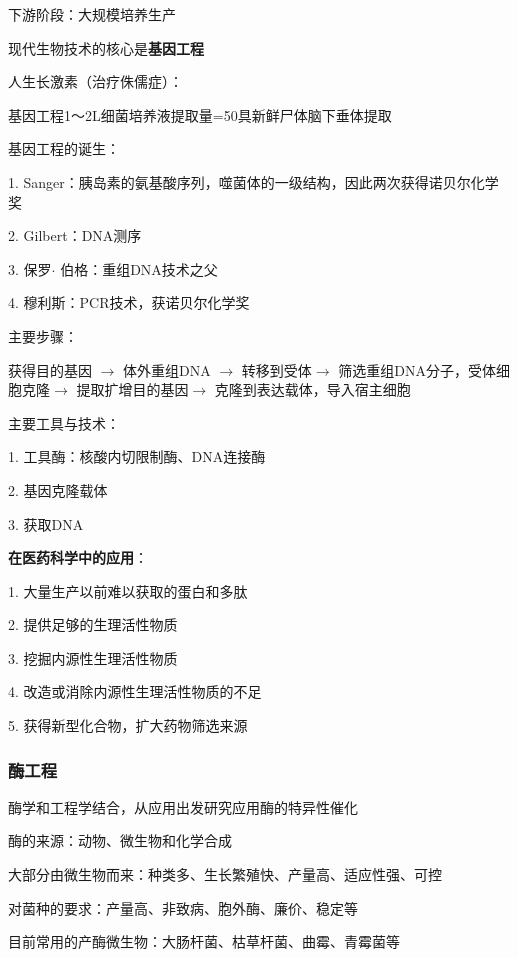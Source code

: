 下游阶段：大规模培养生产
\begin{notation}
    现代生物技术的核心是\textbf{基因工程}
\end{notation}
\begin{eg}
    人生长激素（治疗侏儒症）：

    基因工程1～2L细菌培养液提取量=50具新鲜尸体脑下垂体提取
\end{eg}
基因工程的诞生：

1. Sanger：胰岛素的氨基酸序列，噬菌体的一级结构，因此两次获得诺贝尔化学奖

2. Gilbert：DNA测序

3. 保罗$\cdot $ 伯格：重组DNA技术之父

4. 穆利斯：PCR技术，获诺贝尔化学奖
\begin{notation}
    主要步骤：

    获得目的基因 $\to $ 体外重组DNA $\to $ 转移到受体$\to $ 筛选重组DNA分子，受体细胞克隆$\to $ 提取扩增目的基因$\to $ 克隆到表达载体，导入宿主细胞

    主要工具与技术：

    1. 工具酶：核酸内切限制酶、DNA连接酶

    2. 基因克隆载体

    3. 获取DNA
\end{notation}
\begin{notation}
    \textbf{在医药科学中的应用}：

    1. 大量生产以前难以获取的蛋白和多肽

    2. 提供足够的生理活性物质

    3. 挖掘内源性生理活性物质

    4. 改造或消除内源性生理活性物质的不足

    5. 获得新型化合物，扩大药物筛选来源
\end{notation}
\subsubsection*{酶工程}%
\label{subsub:酶工程}
\begin{defi}
    酶学和工程学结合，从应用出发研究应用酶的特异性催化
\end{defi}
酶的来源：动物、微生物和化学合成

大部分由微生物而来：种类多、生长繁殖快、产量高、适应性强、可控

对菌种的要求：产量高、非致病、胞外酶、廉价、稳定等

目前常用的产酶微生物：大肠杆菌、枯草杆菌、曲霉、青霉菌等
